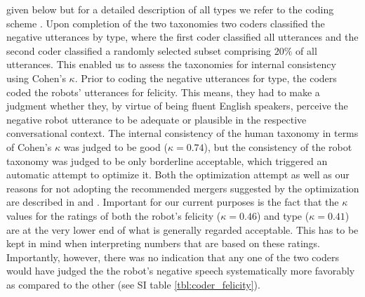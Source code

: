 given below but for a detailed description of all types we refer to the coding scheme \cite{Foerster2018}.
Upon completion of the two taxonomies two coders classified the negative utterances by type, where the first coder classified all utterances and the second coder
classified a randomly selected subset comprising $20\%$ of all utterances. This enabled us to assess the taxonomies for internal consistency
using Cohen's $\kappa$. Prior to coding the negative utterances for type, the coders coded the robots' utterances for felicity. This means, they had to make a
judgment whether they, by virtue of being fluent English speakers, perceive the negative robot utterance to be adequate or plausible in the respective
conversational context. The internal consistency of the human taxonomy in terms of Cohen's $\kappa$ was judged to be good ($\kappa=0.74$), but the consistency
of the robot taxonomy was judged to be only borderline acceptable, which triggered an automatic attempt to optimize it. Both the optimization attempt as well as our
reasons for not adopting the recommended mergers suggested by the optimization are described in \cite{Foerster2017} and \cite{Foerster2013}. Important for our current
purposes is the fact that the $\kappa$ values for the ratings of both the robot's felicity ($\kappa=0.46$) and type ($\kappa=0.41$) are at the very lower end
of what is generally regarded acceptable. This has to be kept in mind when interpreting numbers that are based on these ratings. Importantly, however, there was
no indication that any one of the two coders would have judged the the robot's negative speech systematically more favorably as compared to the other (see SI table
\ref{tbl:coder_felicity}).

